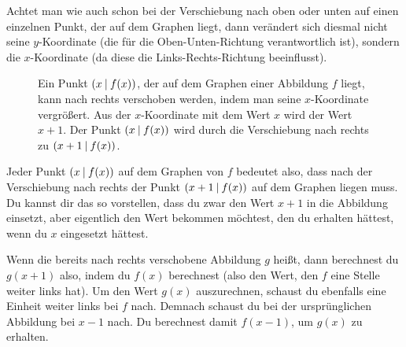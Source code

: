\documentclass[../../main.tex]{subfiles}
\begin{document}
Achtet man wie auch schon bei der Verschiebung nach oben oder unten auf einen einzelnen Punkt, der auf dem Graphen liegt, dann verändert sich diesmal nicht seine $y$-Koordinate (die für die Oben-Unten-Richtung verantwortlich ist), sondern die $x$-Koordinate (da diese die Links-Rechts-Richtung beeinflusst).

\begin{figure}[ht]
    \centering
    \caption{Ein Punkt $\left(x \:\middle|\: f(x)\right)$, der auf dem Graphen einer Abbildung $f$ liegt, kann nach rechts verschoben werden, indem man seine $x$-Koordinate vergrößert. Aus der $x$-Koordinate mit dem Wert $x$ wird der Wert $x+1$. Der Punkt $\left(x \:\middle|\: f(x)\right)$ wird durch die Verschiebung nach rechts zu $\left(x+1 \:\middle|\: f(x)\right)$.}
\end{figure}

Jeder Punkt $\left(x \:\middle|\: f(x)\right)$ auf dem Graphen von $f$ bedeutet also, dass nach der Verschiebung nach rechts der Punkt $\left(x+1 \:\middle|\: f(x)\right)$ auf dem Graphen liegen muss. Du kannst dir das so vorstellen, dass du zwar den Wert $x+1$ in die Abbildung einsetzt, aber eigentlich den Wert bekommen möchtest, den du erhalten hättest, wenn du $x$ eingesetzt hättest.

Wenn die bereits nach rechts verschobene Abbildung $g$ heißt, dann berechnest du $g(x+1)$ also, indem du $f(x)$ berechnest (also den Wert, den $f$ eine Stelle weiter links hat). Um den Wert $g(x)$ auszurechnen, schaust du ebenfalls eine Einheit weiter links bei $f$ nach. Demnach schaust du bei der ursprünglichen Abbildung bei $x-1$ nach. Du berechnest damit $f(x-1)$, um $g(x)$ zu erhalten.
\end{document}
